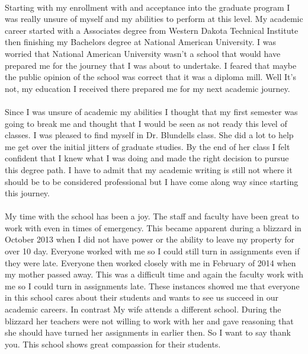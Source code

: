 \documentclass[12pt,titlepage]{article}
\begin{document}
\paragraph {}
Starting with my enrollment with and acceptance into the graduate program I was really unsure of myself and my abilities to perform at this level. My academic career started with a Associates degree from Western Dakota Technical Institute then finishing my Bachelors degree at National American University. I was worried that National American University wasn't a school that would have prepared me for the journey that I was about to undertake. I feared that maybe the public opinion of the school was correct that it was a diploma mill. Well It's not, my education I received there prepared me for my next academic journey.
\paragraph {}
Since I was unsure of academic my abilities I thought that my first semester was going to break me and thought that I would be seen as not ready this level of classes. I was pleased to find myself in Dr. Blundells class. She did a lot to help me get over the initial jitters of graduate studies. By the end of her class I felt confident that I knew what I was doing and made the right decision to pursue this degree path. I have to admit that my academic writing is still not where it should be to be considered professional but I have come along way since starting this journey.
\paragraph {}
My time with the school has been a joy. The staff and faculty have been great to work with even in times of emergency. This became apparent during a blizzard in October 2013 when I did not have power or the ability to leave my property for over 10 day. Everyone worked with me so I could still turn in assignments even if they were late. Everyone then worked closely with me in February of 2014 when my mother passed away. This was a difficult time and again the faculty work with me so I could turn in assignments late.  These instances showed me that everyone in this school cares about their students and wants to see us succeed in our academic careers. In contrast My wife attends a different school. During the blizzard her teachers were not willing to work with her and gave reasoning that she should have turned her assignments in earlier then. So I want to say thank you. This school shows great compassion for their students.
\end{document}
